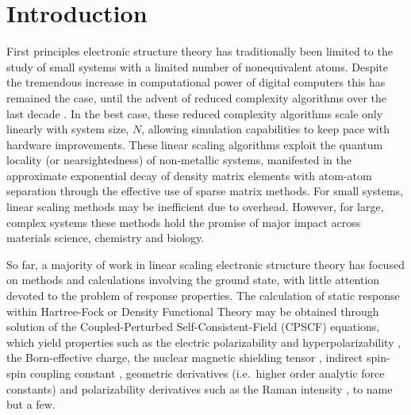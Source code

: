 \documentclass[prl,aps,preprint,showpacs,superbib]{revtex4}
\begin{document}
\section{Introduction}
First principles electronic structure theory has traditionally been limited 
to the study of small systems with a limited number of nonequivalent atoms. 
Despite the tremendous increase in computational power of digital computers this 
has remained the case, until the advent of reduced complexity algorithms over the
last decade \cite{GGalli96,DBowler97,SGoedecker99,POrdejon00,VGogonea01,SWu02}. In the 
best case, these reduced complexity algorithms scale only linearly with system size, $N$, 
allowing simulation capabilities to keep pace with hardware improvements.
These linear scaling algorithms exploit the quantum locality (or nearsightedness) of 
non-metallic systems,  manifested in the approximate exponential decay of density matrix elements 
with atom-atom separation through the effective use of sparse matrix methods. For small systems,
linear scaling methods may be inefficient due to overhead.  However, for large, complex systems
these methods hold the promise of major impact across materials science, chemistry and biology. 

So far, a majority of work in linear scaling electronic structure theory 
has focused on methods and calculations involving the ground state, with little 
attention devoted to the problem of response properties.  The calculation of static
response within  Hartree-Fock or Density Functional Theory may be  obtained through solution 
of the Coupled-Perturbed Self-Consistent-Field (CPSCF) equations, which yield properties 
such as the electric polarizability and hyperpolarizability \cite{HSekino86,SKarna91}, 
the Born-effective charge, the nuclear magnetic shielding tensor \cite{KWolinski90}, 
indirect spin-spin coupling
constant \cite{CPennington91,OMalkin96}, geometric derivatives (i.e.~higher order
analytic force constants) \cite{RAmos89} and polarizability derivatives such as the Raman 
intensity \cite{MLazzeri03,OQuinet01}, to name but a few.
\end{document}
